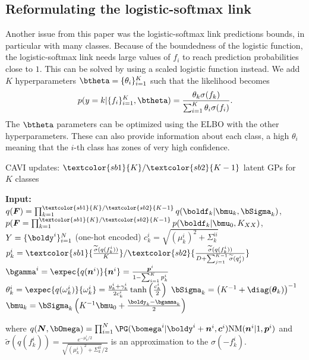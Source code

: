 \subsection{Reformulating the logistic-softmax link}
\label{sec:scale_multiclass}
Another issue from this paper was the logistic-softmax link predictions bounds, in particular with many classes.
Because of the boundedness of the logistic function, the logistic-softmax link needs large values of $f_i$ to reach prediction probabilities close to $1$.
This can be solved by using a scaled logistic function instead.
We add $K$ hyperparameters $\btheta=\{\theta_{i}\}_{i=1}^K$ such that the likelihood becomes
\begin{align*}
    p(y=k|\{f_i\}_{i=1}^K,\btheta) = \frac{\theta_k \sigma(f_k)}{\sum_{i=1}^K \theta_i \sigma(f_i)}.
\end{align*}
The $\btheta$ parameters can be optimized using the \ac{ELBO} with the other hyperparameters.
These can also provide information about each class, a high $\theta_i$ meaning that the $i$-th class has zones of very high confidence.

\begin{algorithm}[H]
    \caption{\ac{CAVI} updates: $\textcolor{sb1}{K}/\textcolor{sb2}{K - 1}$ latent \ac{GPs} for $K$ classes}
    \begin{algorithmic}
    \State \textbf{Input:} $q(\boldsymbol{F}) = \prod_{k=1}^{\textcolor{sb1}{K}/\textcolor{sb2}{K - 1}} q(\boldf_k|\bmu_k, \bSigma_k)$, $p(\boldsymbol{F} = \prod_{k=1}^{\textcolor{sb1}{K}/\textcolor{sb2}{K - 1}} p(\boldf_k|\bmu_0, K_{XX})$, $Y=\{\boldy^i\}_{i=1}^N$ (one-hot encoded)
        \State $c^i_k = \sqrt{(\mu^i_k)^2 + \Sigma_k^{ii}}$
        \State $p^i_k = \textcolor{sb1}{\frac{\widetilde{\sigma}(q(f_k^i))}{K}}/\textcolor{sb2}{\frac{\widetilde{\sigma}(q(f_k^i))}{D + \sum_{j=1}^{K-1}\widetilde{\sigma}(q_j^i)}}$
        \State $\bgamma^i = \expec{q(\boldsymbol{n}^i)}{\boldsymbol{n}^i} = \frac{\boldsymbol{p}^i}{1 - \sum_{i=1}^K p^i_k}$
        \State $\theta_k^i = \expec{q(\omega_k^i)}{\omega_k^i} = \frac{y_k^i + \gamma_k^i}{2c_k^i}\tanh\left(\frac{c_k^i}{2}\right)$
        \State $\bSigma_k = \left(K^{-1} + \diag(\boldsymbol{\theta}_k)\right)^{-1}$
        \State $\bmu_k = \bSigma_k\left(K^{-1}\bmu_0 + \frac{\boldy_k - \bgamma_k}{2}\right)$
    \EndWhile
    \end{algorithmic}
    where $q(\boldsymbol{N}, \bOmega) = \prod_{i=1}^N \PG(\bomega^i|\boldy^i + \boldsymbol{n}^i, \boldsymbol{c}^i)\mathrm{NM}(\boldsymbol{n}^i|1, \boldsymbol{p}^i)$ and $\widetilde{\sigma}(q(f_k^i)) = \frac{e^{-\mu_k^i/2}}{\sqrt{(\mu_k^i)^2 + \Sigma^{ii}_k} / 2}$ is an approximation to the $\sigma(-f^i_k)$.
    \label{alg:cavi_multiclass}
\end{algorithm}

